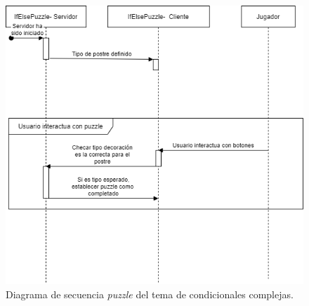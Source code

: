         \begin{figure}[H]
        \centering
        \includegraphics[width=0.8\linewidth]{images/DiagramaSecuenciaPuzzleIfElse.png}
        \caption{Diagrama de secuencia \textit{puzzle} del tema de condicionales complejas.}
        \label{fig:diagrama_sec_if_else}
    \end{figure}

